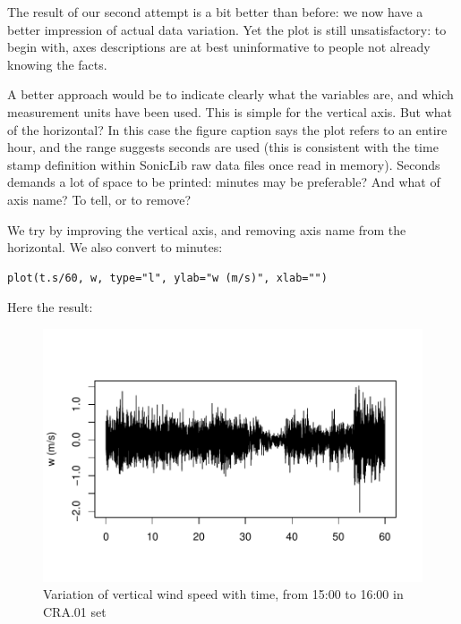 \documentclass[a4paper,10pt]{book}
\begin{document}
The result of our second attempt is a bit better than before: we now have a better impression of actual data variation. Yet the plot is still unsatisfactory: to begin with, axes descriptions are at best uninformative to people not already knowing the facts.

A better approach would be to indicate clearly what the variables are, and which measurement units have been used. This is simple for the vertical axis. But what of the horizontal? In this case the figure caption says the plot refers to an entire hour, and the range suggests seconds are used (this is consistent with the time stamp definition within SonicLib raw data files once read in memory). Seconds demands a lot of space to be printed: minutes may be preferable? And what of axis name? To tell, or to remove?

We try by improving the vertical axis, and removing axis name from the horizontal. We also convert to minutes:

\begin{verbatim}
plot(t.s/60, w, type="l", ylab="w (m/s)", xlab="")
\end{verbatim}

Here the result:

\begin{figure}[htp]
 \centering
 \begin{center}
 \includegraphics[scale=1.1,keepaspectratio=true]{./diagrams/SimplePlot2.pdf}
 \end{center}
 \caption{Variation of vertical wind speed with time, from 15:00 to 16:00 in CRA.01 set}
 \label{fig:Simple plot 2}
\end{figure}
\end{document}
